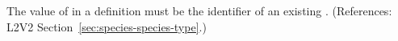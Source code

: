 The value of  in a \Species definition must be the
identifier of an existing \SpeciesType.  (References: L2V2
Section~\ref{sec:species-species-type}.)

